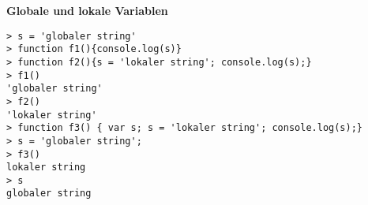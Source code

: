 \par\noindent\textbf{Globale und lokale Variablen}

\begin{verbatim}
> s = 'globaler string'
> function f1(){console.log(s)}
> function f2(){s = 'lokaler string'; console.log(s);}
> f1()
'globaler string'
> f2()
'lokaler string'
> function f3() { var s; s = 'lokaler string'; console.log(s);}
> s = 'globaler string';
> f3()
lokaler string
> s 
globaler string
\end{verbatim}

